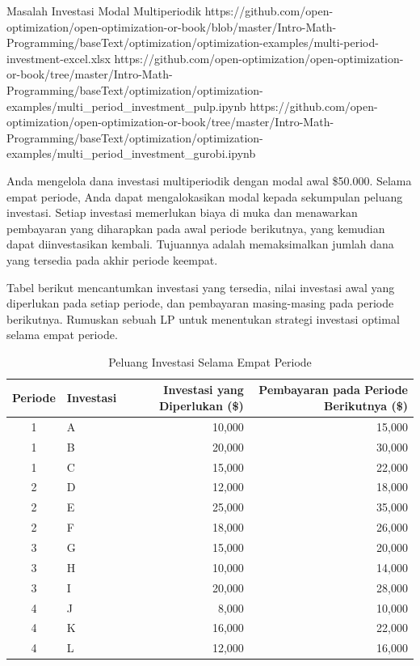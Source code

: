 \begin{examplewithallcode}{Masalah Investasi Modal Multiperiodik}
{https://github.com/open-optimization/open-optimization-or-book/blob/master/Intro-Math-Programming/baseText/optimization/optimization-examples/multi-period-investment-excel.xlsx}
{https://github.com/open-optimization/open-optimization-or-book/tree/master/Intro-Math-Programming/baseText/optimization/optimization-examples/multi_period_investment_pulp.ipynb}
{https://github.com/open-optimization/open-optimization-or-book/tree/master/Intro-Math-Programming/baseText/optimization/optimization-examples/multi_period_investment_gurobi.ipynb}
\label{ex:multi-period-capital-investment}

Anda mengelola dana investasi multiperiodik dengan modal awal \$50.000. Selama empat periode, Anda dapat mengalokasikan modal kepada sekumpulan peluang investasi. Setiap investasi memerlukan biaya di muka dan menawarkan pembayaran yang diharapkan pada awal periode berikutnya, yang kemudian dapat diinvestasikan kembali. Tujuannya adalah memaksimalkan jumlah dana yang tersedia pada akhir periode keempat.

Tabel berikut mencantumkan investasi yang tersedia, nilai investasi awal yang diperlukan pada setiap periode, dan pembayaran masing-masing pada periode berikutnya. Rumuskan sebuah LP untuk menentukan strategi investasi optimal selama empat periode.

\end{examplewithallcode}

\begin{table}[h!]
\begin{center}
\begin{tabular} {|c|l|r|r|}
\hline
Periode & Investasi & Investasi yang Diperlukan (\$) & Pembayaran pada Periode Berikutnya (\$) \\
\hline\hline
1 & A & 10{,}000 & 15{,}000 \\
1 & B & 20{,}000 & 30{,}000 \\
1 & C & 15{,}000 & 22{,}000 \\
\hline
2 & D & 12{,}000 & 18{,}000 \\
2 & E & 25{,}000 & 35{,}000 \\
2 & F & 18{,}000 & 26{,}000 \\
\hline
3 & G & 15{,}000 & 20{,}000 \\
3 & H & 10{,}000 & 14{,}000 \\
3 & I & 20{,}000 & 28{,}000 \\
\hline
4 & J &  8{,}000 & 10{,}000 \\
4 & K & 16{,}000 & 22{,}000 \\
4 & L & 12{,}000 & 16{,}000 \\
\hline
\end{tabular}
\caption{Peluang Investasi Selama Empat Periode}
\label{tab:multi_period_investments}
\end{center}
\end{table}

